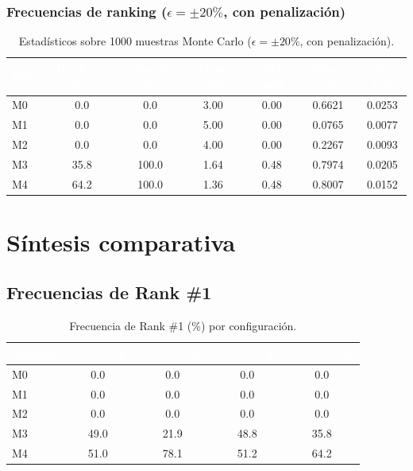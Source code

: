 \documentclass[12pt,a4paper,oneside]{book}
\begin{document}
\subsubsection*{Frecuencias de ranking ($\epsilon = \pm 20\%$, con penalización)}
\begin{table}[H]
\centering
\caption{Estadísticos sobre 1000 muestras Monte Carlo ($\epsilon = \pm 20\%$, con penalización).}
\renewcommand{\arraystretch}{1.3}
\begin{tabular}{lcccccc}
\toprule
\rowcolor{primary}
\textcolor{white}{\textbf{Mét.}} & \textcolor{white}{\textbf{Rank \#1 (\%)}} & \textcolor{white}{\textbf{Top-2 (\%)}} & \textcolor{white}{\textbf{Mean rank}} & \textcolor{white}{\textbf{SD rank}} & \textcolor{white}{\textbf{Mean CC}} & \textcolor{white}{\textbf{SD CC}} \\
\midrule
M0 & 0.0 & 0.0 & 3.00 & 0.00 & 0.6621 & 0.0253 \\
M1 & 0.0 & 0.0 & 5.00 & 0.00 & 0.0765 & 0.0077 \\
M2 & 0.0 & 0.0 & 4.00 & 0.00 & 0.2267 & 0.0093 \\
M3 & 35.8 & 100.0 & 1.64 & 0.48 & 0.7974 & 0.0205 \\
M4 & 64.2 & 100.0 & 1.36 & 0.48 & 0.8007 & 0.0152 \\
\bottomrule
\end{tabular}
\end{table}

\newpage
\section{Síntesis comparativa}

\subsection{Frecuencias de Rank \#1}

\begin{table}[H]
\centering
\caption{Frecuencia de Rank \#1 (\%) por configuración.}
\renewcommand{\arraystretch}{1.3}
\begin{tabular}{lcccc}
\toprule
\rowcolor{primary}
\textcolor{white}{\textbf{Método}} &
\textcolor{white}{\textbf{$\epsilon=10\%$ s.p.}} &
\textcolor{white}{\textbf{$\epsilon=10\%$ c.p.}} &
\textcolor{white}{\textbf{$\epsilon=20\%$ s.p.}} &
\textcolor{white}{\textbf{$\epsilon=20\%$ c.p.}} \\
\midrule
M0 & 0.0 & 0.0 & 0.0 & 0.0 \\
M1 & 0.0 & 0.0 & 0.0 & 0.0 \\
M2 & 0.0 & 0.0 & 0.0 & 0.0 \\
M3 & 49.0 & 21.9 & 48.8 & 35.8 \\
M4 & 51.0 & 78.1 & 51.2 & 64.2 \\
\bottomrule
\end{tabular}
\end{table}
\end{document}

